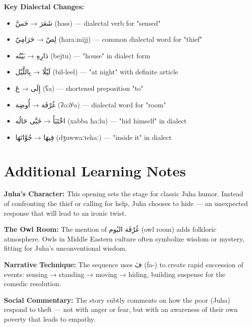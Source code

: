 \documentclass[letterpaper,12pt]{article}
\begin{document}
\textbf{Key Dialectal Changes:}
\begin{itemize}
\item \textarabic{شَعَرَ} → \textarabic{حَسَّ} (ħass) — dialectal verb for "sensed"
\item \textarabic{لِصّ} → \textarabic{حَرَامِيّ} (ħaraːmijj) — common dialectal word for "thief"
\item \textarabic{دَارِهِ} → \textarabic{بَيْتُه} (bejtu) — "house" in dialect form
\item \textarabic{لَيْلًا} → \textarabic{بِاللَّيْل} (bil-leel) — "at night" with definite article
\item \textarabic{إِلَى} → \textarabic{عَ} (ʕa) — shortened preposition "to"
\item \textarabic{غُرْفَة} → \textarabic{أُوضِة} (ʔoːðˤa) — dialectal word for "room"
\item \textarabic{اخْتَبَأَ} → \textarabic{خَبَّى حَالُه} (xabba ħaːlu) — "hid himself" in dialect
\item \textarabic{فِيهَا} → \textarabic{جُوَّاتَهَا} (dʒuwwaːtehaː) — "inside it" in dialect
\end{itemize}

\section{Additional Learning Notes}

\begin{tcolorbox}[colback=boxcolor,colframe=accentcolor,title=\textbf{Cultural and Literary Context},breakable]
\textbf{Juha's Character:} This opening sets the stage for classic Juha humor. Instead of confronting the thief or calling for help, Juha chooses to hide — an unexpected response that will lead to an ironic twist.

\textbf{The Owl Room:} The mention of \textarabic{غُرْفَة البُوم} (owl room) adds folkloric atmosphere. Owls in Middle Eastern culture often symbolize wisdom or mystery, fitting for Juha's unconventional wisdom.

\textbf{Narrative Technique:} The sequence uses \textarabic{فَ} (fa-) to create rapid succession of events: sensing → standing → moving → hiding, building suspense for the comedic resolution.

\textbf{Social Commentary:} The story subtly comments on how the poor (Juha) respond to theft — not with anger or fear, but with an awareness of their own poverty that leads to empathy.
\end{tcolorbox}
\end{document}
